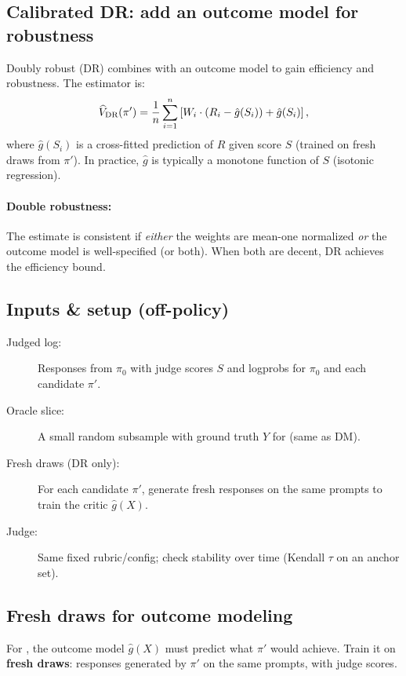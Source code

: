 \subsection{Calibrated DR: add an outcome model for robustness}

Doubly robust (DR) combines \ips{} with an outcome model to gain efficiency and robustness. The estimator is:
\begin{equation}
\widehat{V}_{\text{DR}}(\pi') = \frac{1}{n} \sum_{i=1}^n \left[ W_i \cdot (R_i - \hat{g}(S_i)) + \hat{g}(S_i) \right],
\end{equation}
where $\hat{g}(S_i)$ is a cross-fitted prediction of $R$ given score $S$ (trained on fresh draws from $\pi'$). In practice, $\hat{g}$ is typically a monotone function of $S$ (isotonic regression).

\paragraph{Double robustness:} The estimate is consistent if \emph{either} the weights are mean-one normalized \emph{or} the outcome model is well-specified (or both). When both are decent, DR achieves the efficiency bound.

\subsection{Inputs \& setup (off-policy)}

\begin{description}
\item[Judged log:] Responses from $\pi_0$ with judge scores $S$ and logprobs for $\pi_0$ and each candidate $\pi'$.
\item[Oracle slice:] A small random subsample with ground truth $Y$ for \autocal{} (same as DM).
\item[Fresh draws (DR only):] For each candidate $\pi'$, generate fresh responses on the same prompts to train the critic $\hat{g}(X)$.
\item[Judge:] Same fixed rubric/config; check stability over time (Kendall $\tau$ on an anchor set).
\end{description}

\subsection{Fresh draws for outcome modeling}

For \dr, the outcome model $\hat{g}(X)$ must predict what $\pi'$ would achieve. Train it on \textbf{fresh draws}: responses generated by $\pi'$ on the same prompts, with judge scores.

